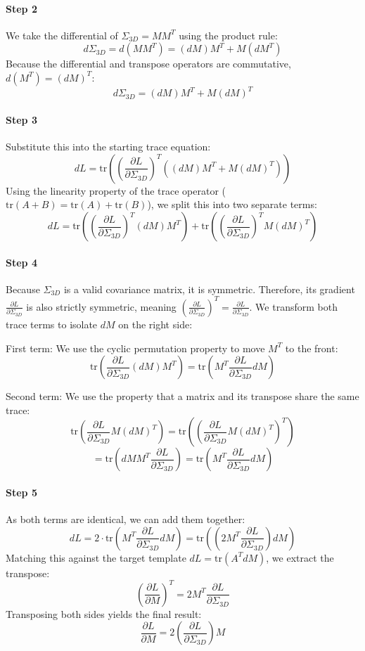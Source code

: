 \paragraph{Step 2} We take the differential of $\Sigma_{3D} = M M^T$ using the product rule:
$$d\Sigma_{3D} = d(M M^T) = (dM) M^T + M (dM^T)$$
Because the differential and transpose operators are commutative, $d(M^T) = (dM)^T$:
$$d\Sigma_{3D} = (dM) M^T + M (dM)^T$$

\paragraph{Step 3} Substitute this into the starting trace equation:
$$dL = \text{tr}\left( \left(\frac{\partial L}{\partial \Sigma_{3D}}\right)^T \left( (dM) M^T + M (dM)^T \right) \right)$$
Using the linearity property of the trace operator ($\text{tr}(A + B) = \text{tr}(A) + \text{tr}(B)$), we split this into two separate terms:
$$dL = 
\text{tr}\left( \left(\frac{\partial L}{\partial \Sigma_{3D}}\right)^T (dM) M^T \right) + 
\text{tr}\left( \left(\frac{\partial L}{\partial \Sigma_{3D}}\right)^T M (dM)^T \right)
$$

\paragraph{Step 4} Because $\Sigma_{3D}$ is a valid covariance matrix, it is symmetric. Therefore, its gradient $\frac{\partial L}{\partial \Sigma_{3D}}$ is also strictly symmetric, meaning $\left(\frac{\partial L}{\partial \Sigma_{3D}}\right)^T = \frac{\partial L}{\partial \Sigma_{3D}}$. We transform both trace terms to isolate $dM$ on the right side:

First term: We use the cyclic permutation property to move $M^T$ to the front:
$$
\text{tr}\left( \frac{\partial L}{\partial \Sigma_{3D}} (dM) M^T \right) =
\text{tr}\left( M^T \frac{\partial L}{\partial \Sigma_{3D}} dM \right)
$$

Second term: We use the property that a matrix and its transpose share the same trace:\linebreak
$$
\text{tr}\left( \frac{\partial L}{\partial \Sigma_{3D}} M (dM)^T \right) =
\text{tr}\left( \left( \frac{\partial L}{\partial \Sigma_{3D}} M (dM)^T \right)^T \right)
$$
$$
= \text{tr}\left( dM M^T \frac{\partial L}{\partial \Sigma_{3D}} \right)
= \text{tr}\left( M^T \frac{\partial L}{\partial \Sigma_{3D}} dM \right)
$$

\paragraph{Step 5} As both terms are identical, we can add them together:
$$
dL = 2 \cdot \text{tr}\left( M^T \frac{\partial L}{\partial \Sigma_{3D}} dM \right) =
\text{tr}\left( \left(2 M^T \frac{\partial L}{\partial \Sigma_{3D}}\right) dM \right)
$$
Matching this against the target template $dL = \text{tr}(A^T dM)$, we extract the transpose:
$$\left(\frac{\partial L}{\partial M}\right)^T = 2 M^T \frac{\partial L}{\partial \Sigma_{3D}}$$
Transposing both sides yields the final result:
$$\frac{\partial L}{\partial M} = 2 \left(\frac{\partial L}{\partial \Sigma_{3D}}\right) M$$

